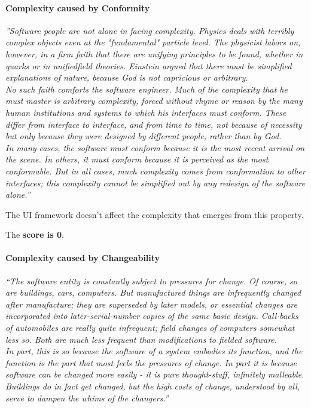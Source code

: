 \paragraph{Complexity caused by Conformity}
\textit{''Software people are not alone in facing complexity. Physics deals with terribly complex objects even at the "fundamental" particle level. The physicist labors on, however, in a firm faith that there are unifying principles to be found, whether in quarks or in unifiedfield theories. Einstein argued that there must be simplified explanations of nature, because God is not capricious or arbitrary. \\ No such faith comforts the software engineer. Much of the complexity that he must master is arbitrary complexity, forced without rhyme or reason by the many human institutions and systems to which his interfaces must conform. These differ from interface to interface, and from time to time, not because of necessity but only because they were designed by different people, rather than by God. \\ In many cases, the software must conform because it is the most recent arrival on the scene. In others, it must conform because it is perceived as the most conformable. But in all cases, much complexity comes from conformation to other interfaces; this complexity cannot be simplified out by any redesign of the software alone.''} \citep[p.~3]{nosilverbullet}

The UI framework doesn't affect the complexity that emerges from this property.

The \textbf{score is 0}.

\paragraph{Complexity caused by Changeability}
\textit{``The software entity is constantly subject to pressures for change. Of course, so are buildings, cars, computers. But manufactured things are infrequently changed after manufacture; they are superseded by later models, or essential changes are incorporated into later-serial-number copies of the same basic design. Call-backs of automobiles are really quite infrequent; field changes of computers somewhat less so. Both are much less frequent than modifications to fielded software. \\ In part, this is so because the software of a system embodies its function, and the function is the part that most feels the pressures of change. In part it is because software can be changed more easily - it is pure thought-stuff, infinitely malleable. Buildings do in fact get changed, but the high costs of change, understood by all, serve to dampen the whims of the changers.''} \citep[p.~4]{nosilverbullet}

